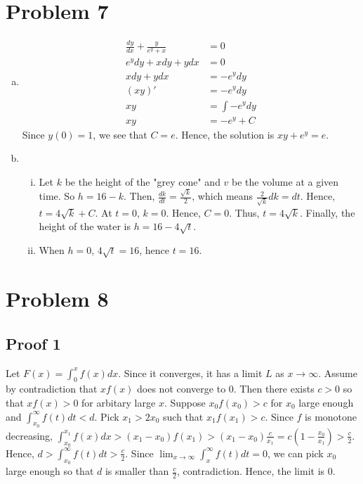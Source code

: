 \documentclass[12pt,a4paper]{article}
\begin{document}
    \section*{Problem 7}
    \begin{enumerate}[a.]
        \item 
        \begin{align*}
            \frac{dy}{dx}+\frac{y}{e^y+x} &= 0\\
            e^ydy+xdy+ydx &= 0\\
            xdy+ydx &= -e^ydy \\
            (xy)' &= -e^ydy \\
            xy &= \int -e^y dy\\
            xy &= -e^y+C
        \end{align*}
        Since $y(0) = 1$, we see that $C=e$. Hence, the solution is $xy+e^y=e$.
    \item 
    \begin{enumerate}[i.] %
        \item Let $k$ be the height of the "grey cone" and $v$ be the volume at a given time. So $h=16-k$. Then, $\frac{dk}{dt} = \frac{\sqrt{k}}{2}$, which means $\frac{2}{\sqrt{k}}dk = dt$. Hence, $t = 4\sqrt{k}+C$. At $t=0$, $k=0$. Hence, $C=0$. Thus, $t = 4\sqrt{k}$. Finally, the height of the water is $h = 16 - 4\sqrt{t}$. 

        \item When $h=0$, $4\sqrt{t} = 16$, hence  $t=16$.
    \end{enumerate}
    
    \end{enumerate}
    \section*{Problem 8}
    \subsection*{Proof 1}
    Let $F(x) = \int_0 ^x f(x) dx$. Since it converges, it has a limit $L$ as $x \to \infty$. Assume by contradiction that $xf(x)$ does not converge to 0. Then there exists $c>0$ so that $xf(x)>0$ for arbitary large $x$.  Suppose $x_0f(x_0)>c$ for $x_0$ large enough and $\int_{x_0} ^\infty f(t)dt < d$. Pick $x_1>2x_0$ such that $x_1f(x_1) > c$. Since $f$ is monotone decreasing, $\int_{x_0} ^{x_1} f(x) dx > (x_1-x_0)f(x_1) > (x_1-x_0)\frac{c}{x_1}  = c\left(1-\frac{x_0}{x_1}\right)>\frac{c}{2} $. Hence, $d > \int_{x_0} ^\infty f(t)dt > \frac{c}{2}$. Since $\lim_{x \rightarrow \infty} \int_x ^\infty f(t)dt = 0$, we can pick $x_0$ large enough so that $d$ is smaller than $\frac{c}{2}$, contradiction. Hence, the limit is 0.
\end{document}
